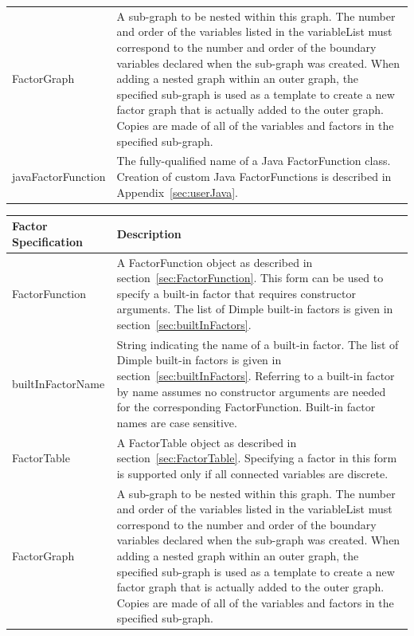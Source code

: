 \begin{longtable} {l p{10cm}}
%
FactorGraph & A sub-graph to be nested within this graph.  The number and order of the variables listed in the variableList must correspond to the number and order of the boundary variables declared when the sub-graph was created.  When adding a nested graph within an outer graph, the specified sub-graph is used as a template to create a new factor graph that is actually added to the outer graph.  Copies are made of all of the variables and factors in the specified sub-graph. \\
%
javaFactorFunction & The fully-qualified name of a Java FactorFunction class.  Creation of custom Java FactorFunctions is described in Appendix~\ref{sec:userJava}. \\
\end{longtable} 
\fi

\ifjava
\begin{longtable} {l p{10cm}}
Factor Specification & Description \\
\hline
\endhead
%
FactorFunction & A FactorFunction object as described in section~\ref{sec:FactorFunction}. This form can be used to specify a built-in factor that requires constructor arguments.  The list of Dimple built-in factors is given in section~\ref{sec:builtInFactors}.\\
%
builtInFactorName & String indicating the name of a built-in factor.  The list of Dimple built-in factors is given in section~\ref{sec:builtInFactors}.  Referring to a built-in factor by name assumes no constructor arguments are needed for the corresponding FactorFunction.  Built-in factor names are case sensitive.  \\
%
FactorTable & A FactorTable object as described in section~\ref{sec:FactorTable}.  Specifying a factor in this form is supported only if all connected variables are discrete. \\
%
FactorGraph & A sub-graph to be nested within this graph.  The number and order of the variables listed in the variableList must correspond to the number and order of the boundary variables declared when the sub-graph was created.  When adding a nested graph within an outer graph, the specified sub-graph is used as a template to create a new factor graph that is actually added to the outer graph.  Copies are made of all of the variables and factors in the specified sub-graph. \\
\end{longtable} 

\fi


\ifmatlab
{}
\label{sec:FactorGraph.addFactorVectorized}

